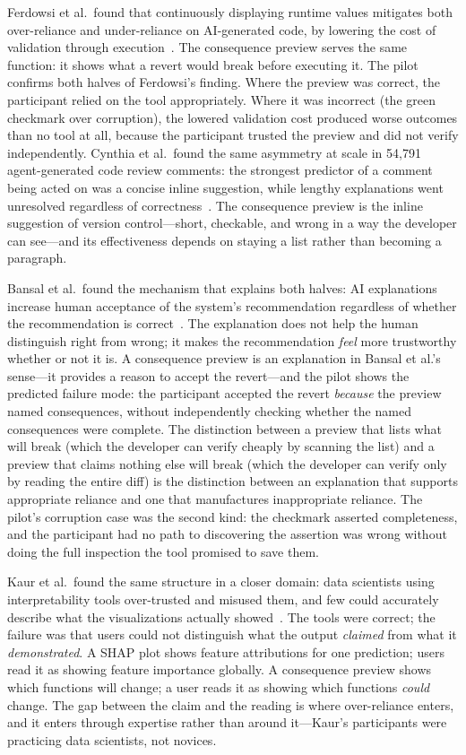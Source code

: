 Ferdowsi et al.\ found that continuously displaying runtime values mitigates
both over-reliance and under-reliance on AI-generated code, by lowering the
cost of validation through execution~\cite{ferdowsi2024}. The consequence
preview serves the same function: it shows what a revert would break before
executing it. The pilot confirms both halves of Ferdowsi's finding. Where the
preview was correct, the participant relied on the tool appropriately. Where it
was incorrect (the green checkmark over corruption), the lowered validation cost
produced worse outcomes than no tool at all, because the participant trusted
the preview and did not verify independently. Cynthia et al.\ found the same
asymmetry at scale in 54{,}791 agent-generated code review comments: the
strongest predictor of a comment being acted on was a concise inline
suggestion, while lengthy explanations went unresolved regardless of
correctness~\cite{cynthia2026gohome}. The consequence preview is the inline
suggestion of version control---short, checkable, and wrong in a way the
developer can see---and its effectiveness depends on staying a list rather than
becoming a paragraph.

\smallskip\noindent
Bansal et al.\ found the mechanism that explains both halves: AI explanations
increase human acceptance of the system's recommendation regardless of
whether the recommendation is correct~\cite{bansal2021}. The explanation does
not help the human distinguish right from wrong; it makes the recommendation
\emph{feel} more trustworthy whether or not it is. A consequence preview is an
explanation in Bansal et al.'s sense---it provides a reason to accept the
revert---and the pilot shows the predicted failure mode: the participant
accepted the revert \emph{because} the preview named consequences, without
independently checking whether the named consequences were complete. The
distinction between a preview that lists what will break (which the developer
can verify cheaply by scanning the list) and a preview that claims nothing
else will break (which the developer can verify only by reading the entire
diff) is the distinction between an explanation that supports appropriate
reliance and one that manufactures inappropriate reliance. The pilot's
corruption case was the second kind: the checkmark asserted completeness,
and the participant had no path to discovering the assertion was wrong without
doing the full inspection the tool promised to save them.

\smallskip\noindent
Kaur et al.\ found the same structure in a closer domain: data scientists using
interpretability tools over-trusted and misused them, and few could accurately
describe what the visualizations actually showed~\cite{kaur2020}. The tools were correct; the failure was that users could not distinguish what
the output \emph{claimed} from what it \emph{demonstrated}. A SHAP plot shows feature
attributions for one prediction; users read it as showing feature importance
globally. A consequence preview shows which functions will change; a user reads it
as showing which functions \emph{could} change. The gap between the claim and the
reading is where over-reliance enters, and it enters through expertise rather
than around it---Kaur's participants were practicing data scientists, not novices.

